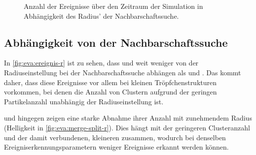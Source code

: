 \begin{figure}
	{\caption{Anzahl der Ereignisse über den Zeitraum der Simulation in Abhängigkeit des Radius' der Nachbarschaftssuche.}\label{fig:eva:ereignis-r}}
\end{figure}

\subsection*{Abhängigkeit von der Nachbarschaftssuche}
In \autoref{fig:eva:ereignis-r} ist zu sehen, dass  und  weit weniger von der Radiuseinstellung bei der Nachbarschaftssuche abhängen als  und . Das kommt daher, dass diese Ereignisse vor allem bei kleinen Tröpfchenstrukturen vorkommen, bei denen die Anzahl von Clustern aufgrund der geringen Partikelanzahl unabhängig der Radiuseinstellung ist.

 und  hingegen zeigen eine starke Abnahme ihrer Anzahl mit zunehmendem Radius (Helligkeit in \autoref{fig:eva:merge-split-r}). Dies hängt mit der geringeren Clusteranzahl und der damit verbundenen, kleineren  zusammen, wodurch bei denselben Ereigniserkennungsparametern weniger Ereignisse erkannt werden können.

